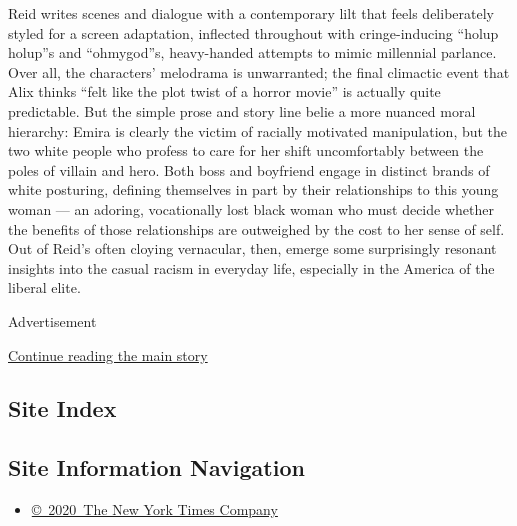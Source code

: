 Reid writes scenes and dialogue with a contemporary lilt that feels
deliberately styled for a screen adaptation, inflected throughout with
cringe-inducing ``holup holup''s and ``ohmygod''s, heavy-handed attempts
to mimic millennial parlance. Over all, the characters' melodrama is
unwarranted; the final climactic event that Alix thinks ``felt like the
plot twist of a horror movie'' is actually quite predictable. But the
simple prose and story line belie a more nuanced moral hierarchy: Emira
is clearly the victim of racially motivated manipulation, but the two
white people who profess to care for her shift uncomfortably between the
poles of villain and hero. Both boss and boyfriend engage in distinct
brands of white posturing, defining themselves in part by their
relationships to this young woman --- an adoring, vocationally lost
black woman who must decide whether the benefits of those relationships
are outweighed by the cost to her sense of self. Out of Reid's often
cloying vernacular, then, emerge some surprisingly resonant insights
into the casual racism in everyday life, especially in the America of
the liberal elite.

Advertisement

\protect\hyperlink{after-bottom}{Continue reading the main story}

\hypertarget{site-index}{%
\subsection{Site Index}\label{site-index}}

\hypertarget{site-information-navigation}{%
\subsection{Site Information
Navigation}\label{site-information-navigation}}

\begin{itemize}
\tightlist
\item
  \href{https://help.nytimes.com/hc/en-us/articles/115014792127-Copyright-notice}{©~2020~The
  New York Times Company}
\end{itemize}

